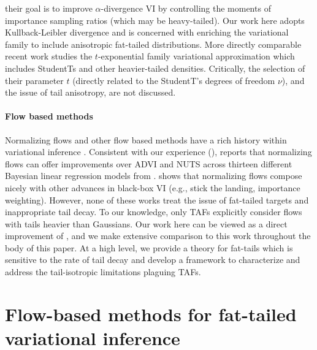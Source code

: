 \documentclass[twoside]{article}
\theoremstyle{definition}
\theoremstyle{remark}
\begin{document}
their goal is to improve $\alpha$-divergence VI by controlling the moments of importance
sampling ratios (which may be heavy-tailed). Our work here adopts
Kullback-Leibler divergence and is concerned with enriching the variational family
to include anisotropic fat-tailed distributions.
More directly comparable recent work \citep{ding2011t,futami2017expectation} studies the $t$-exponential family
variational approximation which includes StudentTs and other
heavier-tailed densities. Critically, the selection of their parameter $t$ (directly related to the
StudentT's degrees of freedom $\nu$), and the issue of tail anisotropy, are not discussed. %

\vspace{-1mm}
\paragraph{Flow based methods}

Normalizing flows and other flow based methods have a rich history within variational
inference \citep{kingma2016improved,rezende2015variational,agrawal2020advances,webb2019improving}.
Consistent with our experience (), \citet{webb2019improving}
reports that normalizing flows can offer improvements over ADVI and NUTS across thirteen different
Bayesian linear regression models from \citet{gelman2006data}.
\citet{agrawal2020advances} shows that normalizing flows compose nicely with other
advances in black-box VI (e.g., stick the landing, importance weighting).
However, none of these works treat the issue of fat-tailed targets and inappropriate tail
decay.
To our knowledge, only TAFs \citep{jaini2020tails} explicitly consider flows with tails
heavier than Gaussians. Our work here can be viewed as a direct improvement of \citet{jaini2020tails},
and we make extensive comparison to this work throughout the body of this paper. At
a high level, we provide a theory for fat-tails which is sensitive to the rate of
tail decay and develop a framework to characterize and address the tail-isotropic limitations plaguing
TAFs.

\vspace{-2mm}
\section{Flow-based methods for fat-tailed variational inference}
\end{document}
